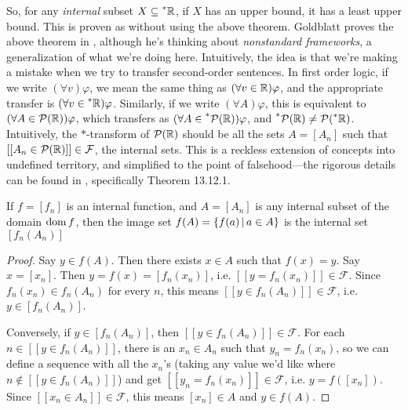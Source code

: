 So, for any \textit{internal} subset $X \subseteq \prescript{*}{}{\mathbb{R}}$, if $X$ has an upper bound, it has a least upper bound. This is proven as \cite[Theorem~11.5.1]{goldblatt1998} without using the above theorem. Goldblatt proves the above theorem in \cite[Theorem~13.12.1]{goldblatt1998}, although he's thinking about \textit{nonstandard frameworks}, a generalization of what we're doing here. Intuitively, the idea is that we're making a mistake when we try to transfer second-order sentences. In first order logic, if we write $(\forall v) \varphi$, we mean the same thing as $(\forall v \in \mathbb{R}) \varphi$, and the appropriate transfer is $(\forall v \in \prescript{*}{}{\mathbb{R}}) \varphi$. Similarly, if we write $(\forall A) \varphi$, this is equivalent to $(\forall A \in \mathcal{P}(\mathbb{R})) \varphi$, which transfers as $(\forall A \in \prescript{*}{}{\mathcal{P}(\mathbb{R})}) \varphi$, and $\prescript{*}{}{\mathcal{P}(\mathbb{R})} \neq \mathcal{P}(\prescript{*}{}{\mathbb{R}})$. Intuitively, the $\ast$-transform of $\mathcal{P}(\mathbb{R})$ should be all the sets $A = [A_n]$ such that $[[A_n \in \mathcal{P}(\mathbb{R})]] \in \mathcal{F}$, the internal sets. This is a reckless extension of concepts into undefined territory, and simplified to the point of falsehood---the rigorous details can be found in \cite[Chapter~13]{goldblatt1998}, specifically Theorem 13.12.1.

\begin{thm}{}\label{imageInternalSetIsInternal}
    If $f = [f_n]$ is an internal function, and $A = [A_n]$ is any internal subset of the domain $\operatorname{dom} f$, then the image set $f(A) = \{f(a) \,|\, a \in A\}$ is the internal set $[f_n(A_n)]$
\end{thm}

\begin{proof}
    Say $y \in f(A)$. Then there exists $x \in A$ such that $f(x) = y$. Say $x = [x_n]$. Then $y = f(x) = [f_n(x_n)]$, i.e. $[[y = f_n(x_n)]] \in \mathcal{F}$. Since $f_n(x_n) \in f_n(A_n)$ for every $n$, this means $[[y \in f_n(A_n)]] \in \mathcal{F}$, i.e. $y \in [f_n(A_n)]$. 
    
    Conversely, if $y \in [f_n(A_n)]$, then $[[y \in f_n(A_n)]] \in \mathcal{F}$. For each $n \in [[y \in f_n(A_n)]]$, there is an $x_n \in A_n$ such that $y_n = f_n(x_n)$, so we can define a sequence with all the $x_n$'s (taking any value we'd like where $n \notin [[y \in f_n(A_n)]]$) and get $[[y_n = f_n(x_n)]] \in \mathcal{F}$, i.e. $y = f([x_n])$. Since $[[x_n \in A_n]] \in \mathcal{F}$, this means $[x_n] \in A$ and $y \in f(A)$.
\end{proof}

